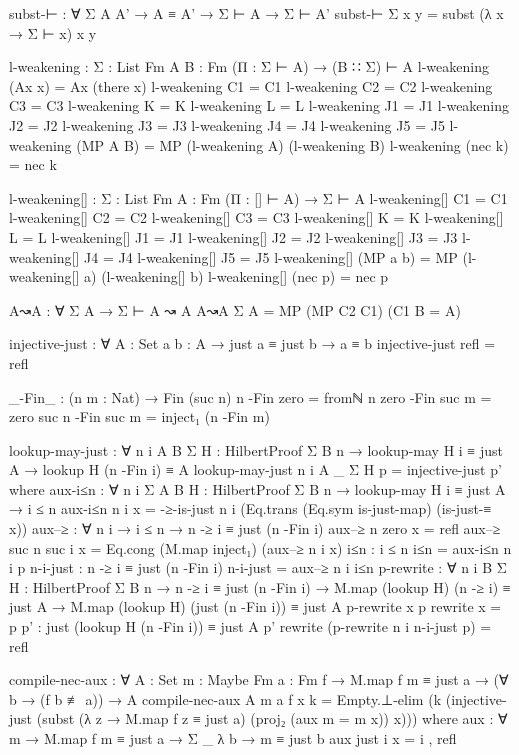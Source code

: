 \begin{spverbatim}
subst-⊢ : ∀ {Σ A A'} → A ≡ A' → Σ ⊢ A → Σ ⊢ A'
subst-⊢ {Σ} x y = subst (λ x →  Σ ⊢ x) x y

l-weakening : {Σ : List Fm} {A B : Fm} (Π : Σ ⊢ A) → (B ∷ Σ) ⊢ A
l-weakening (Ax x) = Ax (there x)
l-weakening C1 = C1
l-weakening C2 = C2
l-weakening C3 = C3
l-weakening K = K
l-weakening L = L
l-weakening J1 = J1
l-weakening J2 = J2
l-weakening J3 = J3
l-weakening J4 = J4
l-weakening J5 = J5
l-weakening (MP A B) = MP (l-weakening A) (l-weakening B)
l-weakening (nec k) = nec k

l-weakening[] : {Σ : List Fm} {A : Fm} (Π : [] ⊢ A) → Σ ⊢ A
l-weakening[] C1 = C1
l-weakening[] C2 = C2
l-weakening[] C3 = C3
l-weakening[] K = K
l-weakening[] L = L
l-weakening[] J1 = J1
l-weakening[] J2 = J2
l-weakening[] J3 = J3
l-weakening[] J4 = J4
l-weakening[] J5 = J5
l-weakening[] (MP a b) = MP (l-weakening[] a) (l-weakening[] b)
l-weakening[] (nec p) = nec p

A↝A : ∀ {Σ A} → Σ ⊢ A ↝ A
A↝A {Σ} {A} = MP (MP C2 C1) (C1 {B = A})

injective-just : ∀ {A : Set} {a b : A} → just a ≡ just b → a ≡ b
injective-just refl = refl

_-Fin_ : (n m : Nat) → Fin (suc n)
n -Fin zero = fromℕ n
zero -Fin suc m = zero
suc n -Fin suc m = inject₁ (n -Fin m)

lookup-may-just : ∀ {n i A B Σ} {H : HilbertProof Σ B n}
  → lookup-may H i ≡ just A
  → lookup H (n -Fin i) ≡ A
lookup-may-just {n} {i} {A} {_} {Σ} {H} p = injective-just p'
  where
    aux-i≤n : ∀ {n i Σ A B} {H : HilbertProof Σ B n} → lookup-may H i ≡ just A → i ≤ n
    aux-i≤n {n} {i} x = -≥-is-just {n} {i} (Eq.trans (Eq.sym is-just-map) (is-just-≡ x))
    aux--≥ : ∀ {n i} → i ≤ n → n -≥ i ≡ just (n -Fin i)
    aux--≥ {n} {zero} x = refl
    aux--≥ {suc n} {suc i} x = Eq.cong (M.map inject₁) (aux--≥ {n} {i} x)
    i≤n : i ≤ n
    i≤n = aux-i≤n {n} {i} p
    n-i-just : n -≥ i ≡ just (n -Fin i)
    n-i-just = aux--≥ {n} {i} i≤n
    p-rewrite : ∀ {n i B Σ} {H : HilbertProof Σ B n}
      → n -≥ i ≡ just (n -Fin i)
      → M.map (lookup H) (n -≥ i) ≡ just A
      → M.map (lookup H) (just (n -Fin i)) ≡ just A
    p-rewrite x p rewrite x = p
    p' : just (lookup H (n -Fin i)) ≡ just A
    p' rewrite (p-rewrite {n} {i} n-i-just p) = refl

compile-nec-aux : ∀ {A : Set} {m : Maybe Fm} {a : Fm} {f} → M.map f m ≡ just a
  → (∀ {b} → (f b ≢ a)) → A
compile-nec-aux {A} {m} {a} {f} x k = Empty.⊥-elim (k (injective-just
  (subst (λ {z → M.map f z ≡ just a}) (proj₂ (aux {m = m} x)) x)))
  where aux : ∀ {m} → M.map f m ≡ just a → Σ _ λ b → m ≡ just b
        aux {just i} x = i , refl


\end{spverbatim}
